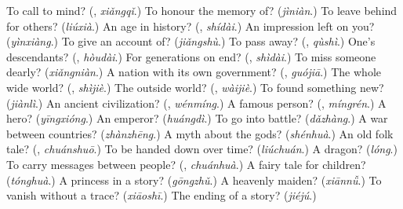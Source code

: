 \begin{tcolorbox}[breakable,colback=teal!4,colframe=teal!35!black,title={Before you move on}]
To call to mind? (\textbf{}, \emph{xiǎngqǐ}.) To honour the memory of? (\emph{jìniàn}.) To leave behind for others? (\emph{liúxià}.) An age in history? (\textbf{}, \emph{shídài}.) An impression left on you? (\emph{yìnxiàng}.) To give an account of? (\emph{jiǎngshù}.) To pass away? (\textbf{}, \emph{qùshì}.) One's descendants? (\textbf{}, \emph{hòudài}.) For generations on end? (\textbf{}, \emph{shìdài}.) To miss someone dearly? (\emph{xiǎngniàn}.) A nation with its own government? (\textbf{}, \emph{guójiā}.) The whole wide world? (\textbf{}, \emph{shìjiè}.) The outside world? (\textbf{}, \emph{wàijiè}.) To found something new? (\emph{jiànlì}.) An ancient civilization? (\textbf{}, \emph{wénmíng}.) A famous person? (\textbf{}, \emph{míngrén}.) A hero? (\emph{yīngxióng}.) An emperor? (\emph{huángdì}.) To go into battle? (\emph{dǎzhàng}.) A war between countries? (\emph{zhànzhēng}.) A myth about the gods? (\emph{shénhuà}.) An old folk tale? (\textbf{}, \emph{chuánshuō}.) To be handed down over time? (\emph{liúchuán}.) A dragon? (\emph{lóng}.) To carry messages between people? (\textbf{}, \emph{chuánhuà}.) A fairy tale for children? (\emph{tónghuà}.) A princess in a story? (\emph{gōngzhǔ}.) A heavenly maiden? (\emph{xiānnǚ}.) To vanish without a trace? (\emph{xiāoshī}.) The ending of a story? (\emph{jiéjú}.)
\end{tcolorbox}
